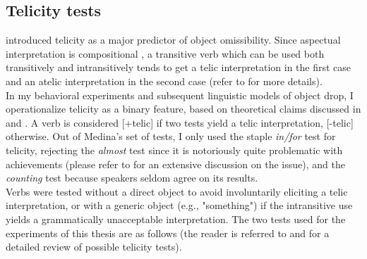 \subsection{Telicity tests} 
 introduced telicity as a major predictor of object omissibility. Since aspectual interpretation is compositional \parencite[14]{Olsen1997}, a transitive verb which can be used both transitively and intransitively tends to get a telic interpretation in the first case and an atelic interpretation in the second case (refer to  for more details).\\ 
In my behavioral experiments and subsequent linguistic models of object drop, I operationalize telicity as a binary feature, based on theoretical claims discussed in  and . A verb is considered [+telic] if two tests yield a telic interpretation, [-telic] otherwise. Out of Medina's set of tests, I only used the staple \textit{in/for} test for telicity, rejecting the \textit{almost} test since it is notoriously quite problematic with achievements (please refer to \textcite{bertinetto-delfitto2000aspect} for an extensive discussion on the issue), and the \textit{counting} test because speakers seldom agree on its results.\\
Verbs were tested without a direct object to avoid involuntarily eliciting a telic interpretation, or with a generic object (e.g., "something") if the intransitive use yields a grammatically unacceptable interpretation. The two tests used for the experiments of this thesis are as follows (the reader is referred to \textcite{Borik2006} and \textcite{Liu2014} for a detailed review of possible telicity tests).

